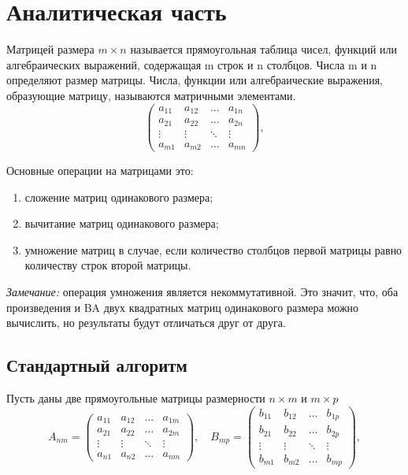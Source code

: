 \chapter{Аналитическая часть}

Матрицей\cite{matrix} размера $m \times n$ называется прямоугольная таблица чисел, функций или алгебраических выражений, содержащая m строк и n столбцов. 
Числа m и n определяют размер матрицы. Числа, функции или алгебраические выражения, образующие матрицу, называются матричными элементами.
\begin{equation}
	\begin{pmatrix}
		a_{11} & a_{12} & \ldots & a_{1n}\\
		a_{21} & a_{22} & \ldots & a_{2n}\\
		\vdots & \vdots & \ddots & \vdots\\
		a_{m1} & a_{m2} & \ldots & a_{mn}
	\end{pmatrix},
\end{equation}

Основные операции на матрицами это:
\begin{enumerate}[label=\arabic*)]
	\item сложение матриц одинакового размера;
	\item вычитание матриц одинакового размера;
	\item умножение матриц в случае, если количество столбцов первой матрицы равно количеству строк второй матрицы. 
\end{enumerate}

\textit{Замечание:} операция умножения является некоммутативной. Это значит, что, оба произведения  и {BA} двух квадратных матриц одинакового размера можно вычислить, но результаты будут отличаться друг от друга.

\section{Стандартный алгоритм}
Пусть даны две прямоугольные матрицы размерности $n \times m$ и $m \times p$
\begin{equation}
	A_{nm} = \begin{pmatrix}
		a_{11} & a_{12} & \ldots & a_{1m}\\
		a_{21} & a_{22} & \ldots & a_{2m}\\
		\vdots & \vdots & \ddots & \vdots\\
		a_{n1} & a_{n2} & \ldots & a_{nm}
	\end{pmatrix},
	\quad
	B_{mp} = \begin{pmatrix}
		b_{11} & b_{12} & \ldots & b_{1p}\\
		b_{21} & b_{22} & \ldots & b_{2p}\\
		\vdots & \vdots & \ddots & \vdots\\
		b_{m1} & b_{m2} & \ldots & b_{mp}
	\end{pmatrix},
\end{equation}

